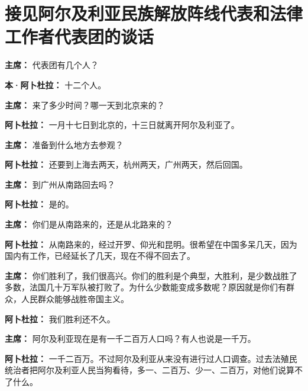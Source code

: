 \section[接见阿尔及利亚民族解放阵线代表和法律工作者代表团的谈话（一九六四年一月二十八日）]{接见阿尔及利亚民族解放阵线代表和法律工作者代表团的谈话}

\begin{duihua}
    
\item[\textbf{主席：}] 代表团有几个人？

\item[\textbf{本·阿卜杜拉：}] 十二个人。

\item[\textbf{主席：}] 来了多少时间？哪一天到北京来的？

\item[\textbf{阿卜杜拉：}] 一月十七日到北京的，十三日就离开阿尔及利亚了。

\item[\textbf{主席：}] 准备到什么地方去参观？

\item[\textbf{阿卜杜拉：}] 还要到上海去两天，杭州两天，广州两天，然后回国。

\item[\textbf{主席：}] 到广州从南路回去吗？

\item[\textbf{阿卜杜拉：}] 是的。

\item[\textbf{主席：}] 你们是从南路来的，还是从北路来的？

\item[\textbf{阿卜杜拉：}] 从南路来的，经过开罗、仰光和昆明。很希望在中国多呆几天，因为国内有工作，已经延长了几天，现在不得不回去了。

\item[\textbf{主席：}] 你们胜利了，我们很高兴。你们的胜利是个典型，大胜利，是少数战胜了多数，法国几十万军队被打败了。为什么少数能变成多数呢？原因就是你们有群众，人民群众能够战胜帝国主义。

\item[\textbf{阿卜杜拉：}] 我们胜利还不久。

\item[\textbf{主席：}] 阿尔及利亚现在是有一千二百万人口吗？有人也说是一千万。

\item[\textbf{阿卜杜拉：}] 一千二百万。不过阿尔及利亚从来没有进行过人口调查。过去法殖民统治者把阿尔及利亚人民当狗看待，多一、二百万、少一、二百万，对他们说算不了什么。


\end{duihua}
